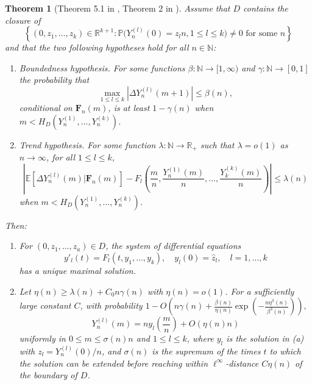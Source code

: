 \documentclass[a4, 11pt]{article}
\numberwithin{equation}{section}
\theoremstyle{plain}
\newtheorem{theorem}{Theorem}[section]
\theoremstyle{definition}
\theoremstyle{remark}
\begin{document}
\begin{theorem}[Theorem 5.1 in \cite{wormald97}, Theorem 2 in \cite{Warnke19}]
\label{thmDEM}
	Assume that $D$ contains the closure of 
	$$\left\{(0,z_1,\ldots,z_k)\in \mathbb{R}^{k+1}:\mathbb{P}\big(Y_n^{(l)}(0)=z_l n, 1\leq l\leq k \big)\neq 0 \text{ for some } n\right\}$$
	and that the two following hypotheses hold for all $n \in \mathbb N$:
	\begin{enumerate}
		\item[$\bullet$] \emph{Boundedness hypothesis.} For some functions $\beta:\mathbb N \rightarrow [1,\infty)$ and $\gamma:\mathbb N \rightarrow [0,1]$ the probability that
		$$\max_{1\leq l\leq k}\left\vert \Delta Y^{(l)}_n(m+1)\right\vert \leq \beta(n),$$ conditional on $\mathbf F_{n}(m)$, is at least $1-\gamma(n)$ when $m<H_D(Y^{(1)}_n,...,Y^{(k)}_n)$.
		\item[$\bullet$] \emph{Trend hypothesis.} For some function $\lambda:\mathbb N \rightarrow \mathbb R_+$ such that $\lambda=o(1)$ as $n \rightarrow \infty$, for all $1 \leq l\leq k$,
		$$\left\vert \mathbb{E}\left[\Delta Y^{(l)}_n(m)\vert \mathbf{F}_{n}(m) \right]-F_l\left(\frac{m}{n},\frac{Y^{(1)}_n(m)}{n},...,\frac{Y^{(k)}_k(m)}{n}\right)\right\vert\leq \lambda(n)$$ when $m<H_D(Y^{(1)}_n,...,Y^{(k)}_n)$.
	\end{enumerate}
	Then:
	\begin{enumerate}[topsep=0cm]
		\item[\emph{(a)}] For $(0,{z}_1,\ldots,{z}_a)\in D$, the system of differential equations
		$$y'_l(t)=F_l(t,y_1,\ldots,y_k),\quad y_l(0)=\hat{z}_l, \quad l=1,\ldots,k $$
		has a unique maximal solution.
		\item[\emph{(b)}] Let $\eta(n) \geq \lambda(n)+C_0 n\gamma(n) $ with $\eta(n)=o(1)$. For a sufficiently large constant $C$, with probability $1-O\left(n\gamma(n)+\frac{\beta(n)}{\eta(n)}\exp\left(-\frac{n\eta^3(n)}{\beta^3(n)}\right)   \right),$
		$$Y^{(l)}_n(m)=n y_l\left(\frac{m}{n}\right)+O\left(\eta(n) n\right) $$
		uniformly in $0\leq m\leq \sigma(n) n $ and $1\leq l \leq k$, where $y_l$ is the solution in \emph{(a)} with $z_l=Y^{(l)}_n(0)/n$, and $\sigma(n)$ is the supremum of the times $t$ to which the solution can be extended before reaching within $\ell^{\infty}$-distance $C\eta(n)$ of the boundary of $D$.
	\end{enumerate}
\end{theorem}





\end{document}
